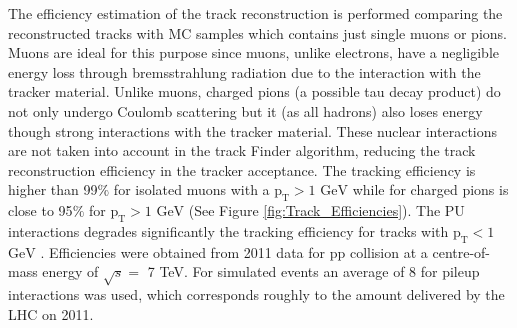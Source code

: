The efficiency estimation of the track reconstruction is performed comparing the reconstructed tracks with MC samples which 
contains just single muons or pions. Muons are ideal for this purpose since muons, unlike electrons, have a negligible energy loss
through bremsstrahlung radiation due to the interaction with the tracker material. Unlike muons, charged pions (a possible tau decay product) do not 
only undergo Coulomb scattering but it (as all hadrons) also loses energy though strong interactions with the tracker material. These nuclear 
interactions are not taken into account in the track Finder algorithm, reducing the track reconstruction efficiency in the tracker acceptance. The tracking efficiency 
is higher than 99$\%$ for isolated muons with a $\textrm{p}_{\textrm{T}}>1$ $\textrm{GeV}$ while for charged pions is close 
to 95$\%$ for $\textrm{p}_{\textrm{T}}>1$ $\textrm{GeV}$ \cite{Chatrchyan:2014fea} (See Figure \ref{fig:Track_Efficiencies}). The PU interactions
degrades significantly the tracking efficiency for tracks with $\textrm{p}_{\textrm{T}}<1$ $\textrm{GeV}$ \cite{Chatrchyan:2014fea}. Efficiencies 
were obtained from 2011 data for pp collision at a centre-of-mass energy of $\sqrt{s} =$  7 TeV. For simulated events an average of 8 for pileup interactions was used, which corresponds
roughly to the amount delivered by the LHC on 2011.






